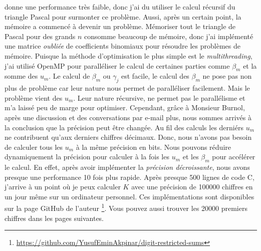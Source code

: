 donne une performance tr\`es faible, donc j'ai du utiliser le calcul r\'ecursif
du triangle  Pascal pour surmonter ce probl\`eme. Aussi, apr\`es un certain
point, la m\'emoire a commenc\'e \`a devenir un probl\`eme. M\'emoriser tout le
triangle de Pascal pour des grands $n$ consomme beaucoup de m\'emoire, donc j'ai
impl\'ement\'e une matrice \textit{oubli\'ee} de coefficients binomiaux pour
r\'esoudre les probl\`emes de m\'emoire. Puisque la m\'ethode d'optimisation le
plus simple est le \textit{multithreading}, j'ai utilis\'e OpenMP pour
parall\'eliser le calcul de certaines parties comme $\beta_{m}$ et la somme des
$u_{m}$. Le calcul de $\beta_{m}$ ou $\gamma_{j}$ est facile, le calcul des
$\beta_{m}$ ne pose pas non plus de probl\`eme car leur nature nous permet de
parall\'eliser facilement. Mais le probl\`eme vient des $u_{m}$. Leur nature
r\'ecursive, ne permet pas le parall\'elisme et m'a laiss\'e peu de marge pour
optimiser. Cependant, gr\^{a}ce \`a Monsieur Burnol, apr\`es une discussion et
des conversations par e-mail plus, nous sommes arriv\'es \`a la conclusion que
la pr\'ecision peut \^{e}tre chang\'ee. Au fil des calculs les derni\'ers
$u_{m}$ ne contribuent qu'aux derniers chiffres d\'ecimaux. Donc, nous n'avons
pas besoin de calculer tous les $u_{m}$ \`a la m\^{e}me pr\'ecision en bits.
Nous pouvons r\'eduire dynamiquement la pr\'ecision pour calculer \`a la fois
les $u_{m}$ et les $\beta_{m}$ pour acc\'el\'erer le calcul. En effet, apr\`es
avoir impl\'ementer la \textit{pr\'ecision d\'ecroissante}, nous avons presque
une performance 10 fois plus rapide. Apr\`es presque 500 lignes de code C,
j'arrive \`a un point o\`u je peux calculer $K$ avec une pr\'ecision de 100000
chiffres en un jour m\^{e}me sur un ordinateur personnel. Ces implémentations
sont disponibles sur la page GitHub de l’auteur
\footnote{\url{https://github.com/YusufEminAkpinar/digit-restricted-sums}}. Vous
pouvez aussi trouver les 20000 premiers chiffres dans les pages suivantes.
\vfill
